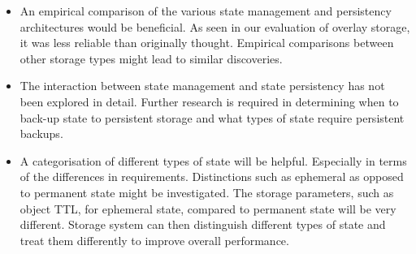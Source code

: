 \begin{itemize}
\item An empirical comparison of the various state management and persistency architectures would be beneficial. As seen in our evaluation of overlay storage, it was less reliable than originally thought. Empirical comparisons between other storage types might lead to similar discoveries.

\item The interaction between state management and state persistency has not been explored in detail. Further research is required in determining when to back-up state to persistent storage and what types of state require persistent backups.

\item A categorisation of different types of state will be helpful. Especially in terms of the differences in requirements. Distinctions such as ephemeral as opposed to permanent state might be investigated. The storage parameters, such as object TTL, for ephemeral state, compared to permanent state will be very different. Storage system can then distinguish different types of state and treat them differently to improve overall performance.
\end{itemize}

